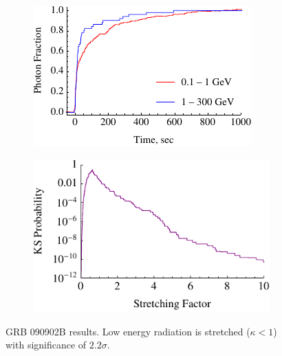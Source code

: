 \documentclass{article}
\begin{document}
\begin{figure}
        \centering
        \begin{subfigure}{0.49\textwidth}
                \includegraphics[width=\textwidth]{lightCurve090902B}
                \label{fig:lightCurve090902B}
        \end{subfigure}
        \begin{subfigure}{0.49\textwidth}
                \includegraphics[width=\textwidth]{probabilities090902B}
                \label{fig:probabilities090902B}
        \end{subfigure}
        \caption{GRB 090902B results. Low energy radiation is stretched ($\kappa < 1$) with significance of $2.2\sigma$.}
        \label{fig:grb090902B}
\end{figure}
\end{document}
